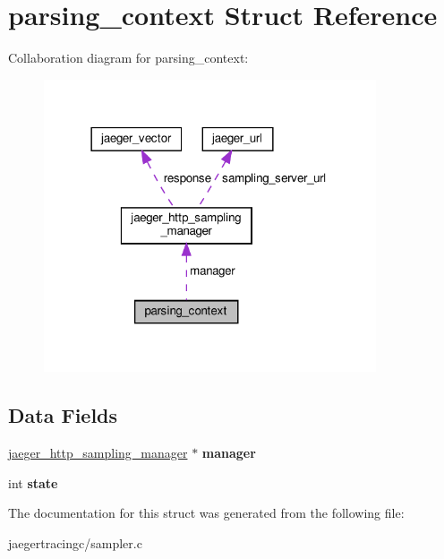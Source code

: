 \hypertarget{structparsing__context}{}\section{parsing\+\_\+context Struct Reference}
\label{structparsing__context}


Collaboration diagram for parsing\+\_\+context\+:\nopagebreak
\begin{figure}[H]
\begin{center}
\leavevmode
\includegraphics[width=278pt]{structparsing__context__coll__graph}
\end{center}
\end{figure}
\subsection*{Data Fields}
\begin{DoxyCompactItemize}
\item 
\mbox{\label{structparsing__context_a9d4da006c6c9f2f167fc788b463965f0}} 
\mbox{\hyperlink{structjaeger__http__sampling__manager}{jaeger\+\_\+http\+\_\+sampling\+\_\+manager}} $\ast$ {\bfseries manager}
\item 
\mbox{\label{structparsing__context_a4887f832590917a2b3850dbde0b2946d}} 
int {\bfseries state}
\end{DoxyCompactItemize}


The documentation for this struct was generated from the following file\+:\begin{DoxyCompactItemize}
\item 
jaegertracingc/sampler.\+c\end{DoxyCompactItemize}

